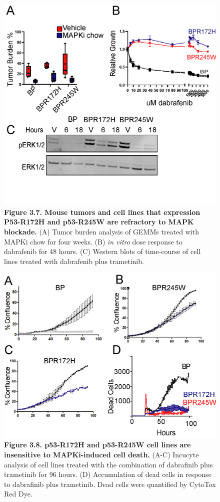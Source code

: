 \begin{figure}
\hypertarget{fig:3.7}{%
\centering
\includegraphics[width=1\textwidth,height=\textheight]{images/p536.png}
\caption{\textbf{Figure 3.7. Mouse tumors and cell lines that expression P53-R172H and p53-R245W are refractory to MAPK blockade.} (A) Tumor burden analysis of GEMMs treated with MAPKi chow for four weeks. (B) \emph{in vitro} dose response to dabrafenib for 48 hours. (C) Western blots of time-course of cell lines treated with dabrafenib plus trametinib.}\label{fig:3.7}
}
\end{figure}

\begin{figure}
\hypertarget{fig:3.8}{%
\centering
\includegraphics[width=1\textwidth,height=\textheight]{images/p537.png}
\caption{\textbf{Figure 3.8. p53-R172H and p53-R245W cell lines are insensitive to MAPKi-induced cell death.} (A-C) Incucyte analysis of cell lines treated with the combination of dabrafinib plus trametinib for 96 hours. (D) Accumulation of dead cells in response to dabrafinib plus trametinib. Dead cells were quantified by CytoTox Red Dye.}\label{fig:3.8}
}
\end{figure}

